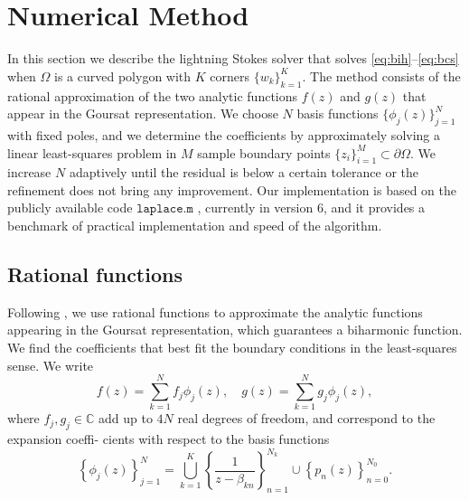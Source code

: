 
\section{Numerical Method \label{sec:method}}
In this section we describe the lightning Stokes solver that solves \eqref{eq:bih}--\eqref{eq:bcs} when $\Omega$ is a curved polygon with $K$ corners $\{w_k\}_{k=1}^K$. The method consists of the rational approximation of the two analytic functions $f(z)$ and $g(z)$ that appear in the Goursat representation. We choose $N$ basis functions $\{\phi_j(z)\}_{j=1}^N$ with fixed poles, and we determine the coefficients by approximately solving a linear least-squares problem in $M$ sample boundary points $\{z_i\}_{i=1}^M \subset \partial\Omega$. We increase $N$ adaptively until the residual is below a certain tolerance or the refinement does not bring any improvement. Our implementation is based on the publicly available code $\texttt{laplace.m}$ \cite{tref20}, currently in version 6, and it provides a benchmark of practical implementation and speed of the algorithm.


\subsection{Rational functions}
Following \cite{gopal19}, we use rational functions to approximate the analytic functions appearing in the
Goursat representation, which guarantees a biharmonic function. We find the coefficients that
best fit the boundary conditions in the least-squares sense. We write
\begin{equation}
f(z) = \sum_{k=1}^N f_j \phi_j(z), \quad g(z) = \sum_{k=1}^N g_j \phi_j(z),
\end{equation}
where $f_j, g_j\in \mathbb{C}$ add up to $4N$ real degrees of freedom, and correspond to the expansion coeffi- cients with respect to the basis functions
\begin{equation}
\left\{\phi_j(z)\right\}_{j=1}^{N} =  \bigcup_{k=1}^K\left\{\frac{1}{z-\beta_{kn}}\right\}_{n=1}^{N_k} \cup \left\{p_n(z)\right\}_{n=0}^{N_0}.
\end{equation}


